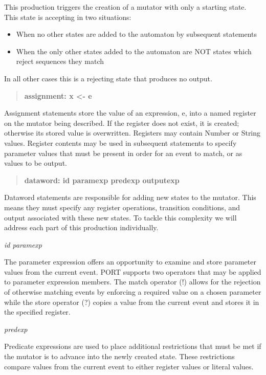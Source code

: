 \iffalse
This production triggers the creation of a mutator with only a starting
state.  This state is accepting in two situations:
\begin{itemize}
  \item{When no other states are added to the automaton by subsequent
    statements}
  \item{When the only other states added to the automaton are NOT states
    which reject sequences they match}
\end{itemize}
In all other cases this is a rejecting state that produces no output.


\begin{quote}
\centering
\textbf{assignment: x <- e}
\end{quote}

Assignment statements store the value of an expression, e, into a named
register on the mutator being described.
If the register does not exist,
it is created;
otherwise its stored value is overwritten.
Registers may contain Number or String values.  Register contents
may be used in subsequent statements to specify parameter values that must
be present in order for an event to match, or as values to be output.



\begin{quote}
\centering
\textbf{dataword: id paramexp predexp outputexp}
\end{quote}


Dataword statements are responsible for adding new states to the
mutator.  This means they must specify any register operations,
transition conditions, and output associated with these new states.  To
tackle this complexity we will address each part of this production
individually.

\textit{id paramexp}

The parameter expression offers an opportunity to examine and store
parameter values from the current event.  PORT supports two operators
that may be applied to parameter expression members.  The match operator
(!) allows for the rejection of otherwise matching events
by enforcing a required value on a
chosen parameter while the store operator (?) copies a value from the
current event and stores it in the specified register.


\textit{predexp}

Predicate expressions are used to place additional restrictions that must
be met if the mutator is to advance into the newly created state.  These
restrictions compare values from the current event to either register
values or literal values.

